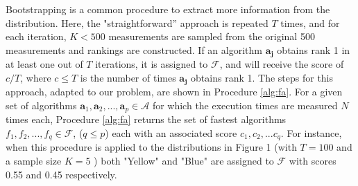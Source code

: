 \documentclass[conference]{IEEEtran}
\newcommand{\p}[1]{{\color{blue} Pdj: #1}}
\begin{document}
 Bootstrapping\cite{bootstrap} is a common procedure to extract more information from the distribution. Here, the "straightforward'' approach is repeated $T$ times, and for each iteration, $K < 500$ measurements are sampled from the original 500 measurements and rankings are constructed. If an algorithm $\mathbf{a_j}$ obtains rank 1 in at least one out of $T$ iterations, it is assigned to $\mathcal{F}$, and will
 receive the score of  $c/T$, where $c \le T$ is the number of times $\mathbf{a_j}$ obtains rank 1. The steps for
 this approach, adapted to our problem, are shown in Procedure \ref{alg:fa}. For a given set of algorithms $
 \mathbf{a}_1,\mathbf{a}_2 ,..., \mathbf{a}_p\in \mathcal{A}$ for which the execution times are measured $N$ times each,
 Procedure \ref{alg:fa} returns the set of fastest algorithms $f_1, f_2, ..., f_q \in  \mathcal{F}$, ($q \le p$) each with an associated score $c_1,c_2,...c_q$.
 For instance, when this procedure is applied to the distributions in Figure 1 (with $T=100$ and a sample size $K=5$ ) both "Yellow" and "Blue" are assigned to $\mathcal{F}$ with scores 0.55 and 0.45 respectively. 

 
\end{document}
